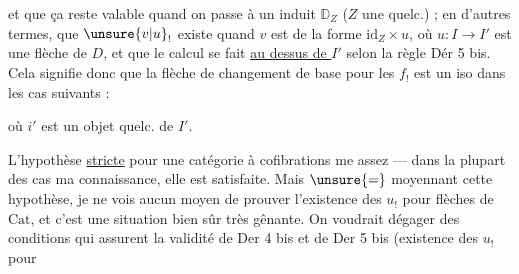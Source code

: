 et que ça reste valable quand on passe
à un  induit $\mathbb{D}_Z$ ($Z$ une 
quelc.) ; en d'autres termes, que $\unsure{v|u}_!$ existe
quand $v$ est de la forme $\mathrm{id}_Z\times u$, où $u:I\to I'$
est une flèche de $D$, et que le
calcul se fait \uline{au dessus de $I'$} selon
la règle Dér 5 bis. Cela signifie donc que
la flèche de changement de base pour les
$f_!$ est un iso dans les cas suivants :


où $i'$ est un objet quelc. de $I'$.

L'hypothèse \uline{stricte} pour une catégorie à
cofibrations me  assez  --- dans
la plupart des cas  ma connaissance, elle
est satisfaite. Mais  $\unsure{=}$
moyennant cette hypothèse, je ne vois
aucun moyen de prouver l'existence
des $u_!$ pour \uline{} flèches de $\mathrm{Cat}$, et c'est
une situation bien sûr très gênante.
On voudrait  dégager des
conditions qui assurent la validité de Der 4 bis
et de Der 5 bis (existence des $u_!$ pour
